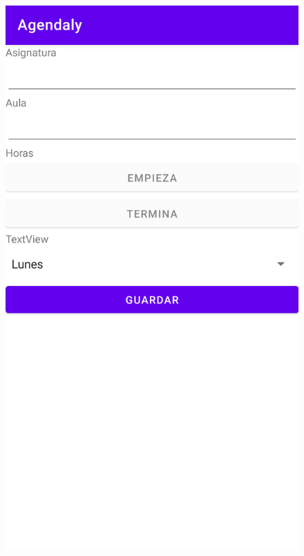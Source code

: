 \documentclass[a4paper,openright,12pt]{article}
\begin{document}
\begin{figure}
            \includegraphics[scale=0.05]{Add.png} 

\end{figure}
\end{document}
